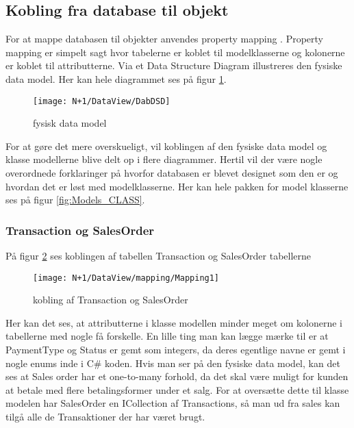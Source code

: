 \subsection{Kobling fra database til objekt}
For at mappe databasen til objekter anvendes property mapping \cite{gh:Mapping}. Property mapping er simpelt sagt hvor tabelerne er koblet til modelklasserne og kolonerne er koblet til attributterne. Via et Data Structure Diagram illustreres den fysiske data model. Her kan hele diagrammet ses på figur \ref{fig:DSD}.

\begin{figure}[H]
    \centering
    \texttt{[image: N+1/DataView/DabDSD]}
    \caption{fysisk data model}
    \label{fig:DSD}
\end{figure}

For at gøre det mere overskueligt, vil koblingen af den fysiske data model og klasse modellerne blive delt op i flere diagrammer. Hertil vil der være nogle overordnede forklaringer på hvorfor databasen er blevet designet som den er og hvordan det er løst med modelklasserne. Her kan hele pakken for model klasserne ses på figur \ref{fig:Models_CLASS}.

\subsubsection{Transaction og SalesOrder}
På figur \ref{fig:Mapping_TS} ses koblingen af tabellen Transaction og SalesOrder tabellerne

\begin{figure}[H]
    \centering
    \texttt{[image: N+1/DataView/mapping/Mapping1]}
    \caption{kobling af Transaction og SalesOrder}
    \label{fig:Mapping_TS}
\end{figure}

Her kan det ses, at attributterne i klasse modellen minder meget om kolonerne i tabellerne med nogle få forskelle. En lille ting man kan lægge mærke til er at PaymentType og Status er gemt som integers, da deres egentlige navne er gemt i nogle enums inde i C\# koden. 
\newline\newline
Hvis man ser på den fysiske data model, kan det ses at Sales order har et one-to-many forhold, da det skal være muligt for kunden at betale med flere betalingsformer under et salg. For at oversætte dette til klasse modelen har SalesOrder en ICollection af Transactions, så man ud fra sales kan tilgå alle de Transaktioner der har været brugt. 

